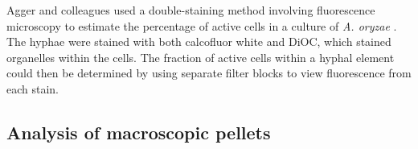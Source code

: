 Agger and colleagues used a double-staining method involving fluorescence microscopy to estimate the percentage of active cells in a culture of \emph{A. oryzae} \cite{agger1998}. The hyphae were stained with both calcofluor white and DiOC, which stained organelles within the cells. The fraction of active cells within a hyphal element could then be determined by using separate filter blocks to view fluorescence from each stain.

\subsection{Analysis of macroscopic pellets}



